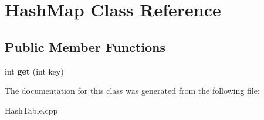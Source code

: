 \hypertarget{classHashMap}{}\section{Hash\+Map Class Reference}
\label{classHashMap}
\subsection*{Public Member Functions}
\begin{DoxyCompactItemize}
\item 
int {\bfseries get} (int key)\hypertarget{classHashMap_a997e1616f02d0ca0b61b146c87c8e974}{}\label{classHashMap_a997e1616f02d0ca0b61b146c87c8e974}

\end{DoxyCompactItemize}


The documentation for this class was generated from the following file\+:\begin{DoxyCompactItemize}
\item 
Hash\+Table.\+cpp\end{DoxyCompactItemize}
